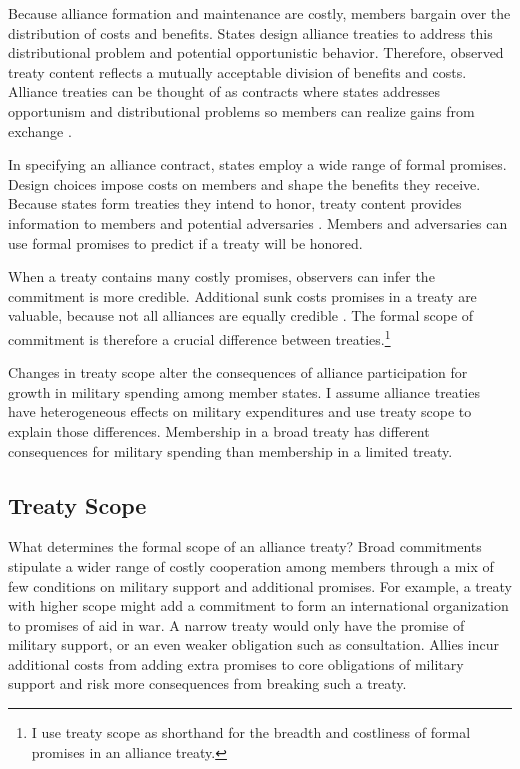\documentclass[12pt]{article}
\begin{document}
Because alliance formation and maintenance are costly, members bargain over the distribution of costs and benefits.
States design alliance treaties to address this distributional problem and potential opportunistic behavior. 
Therefore, observed treaty content reflects a mutually acceptable division of benefits and costs. 
Alliance treaties can be thought of as contracts where states addresses opportunism and distributional problems \citep{Williamson1985, Koremenosetal2001} so members can realize gains from exchange \citep{Lake1996, Bensonetal2014}.


In specifying an alliance contract, states employ a wide range of formal promises. 
Design choices impose costs on members and shape the benefits they receive.
Because states form treaties they intend to honor, treaty content provides information to members and potential adversaries \citep{Leeds2003}. 
Members and adversaries can use formal promises to predict if a treaty will be honored.


When a treaty contains many costly promises, observers can infer the commitment is more credible. 
Additional sunk costs promises in a treaty are valuable, because not all alliances are equally credible \citep{Benson2012}. 
The formal scope of commitment is therefore a crucial difference between treaties.\footnote{I use treaty scope as shorthand for the breadth and costliness of formal promises in an alliance treaty.} 


Changes in treaty scope alter the consequences of alliance participation for growth in military spending among member states. 
I assume alliance treaties have heterogeneous effects on military expenditures and use treaty scope to explain those differences. 
Membership in a broad treaty has different consequences for military spending than membership in a limited treaty. 


\subsection{Treaty Scope}


What determines the formal scope of an alliance treaty? 
Broad commitments stipulate a wider range of costly cooperation among members through a mix of few conditions on military support and additional promises.
For example, a treaty with higher scope might add a commitment to form an international organization to promises of aid in war.
A narrow treaty would only have the promise of military support, or an even weaker obligation such as consultation.  
Allies incur additional costs from adding extra promises to core obligations of military support and risk more consequences from breaking such a treaty. 
\end{document}
